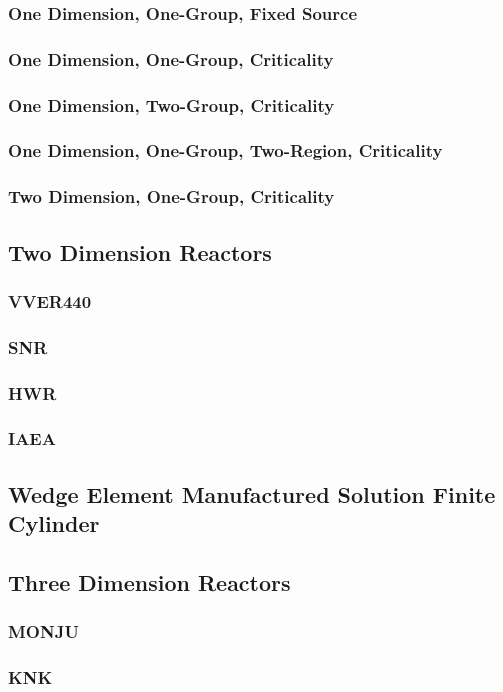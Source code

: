     \subsubsection{One Dimension, One-Group, Fixed Source}
    \subsubsection{One Dimension, One-Group, Criticality}
    \subsubsection{One Dimension, Two-Group, Criticality}
    \subsubsection{One Dimension, One-Group, Two-Region, Criticality}
    \subsubsection{Two Dimension, One-Group, Criticality}
  \subsection{Two Dimension Reactors}
    \subsubsection{VVER440}
    \subsubsection{SNR}
    \subsubsection{HWR}
    \subsubsection{IAEA}
  \subsection{Wedge Element Manufactured Solution Finite Cylinder}
  \subsection{Three Dimension Reactors}
    \subsubsection{MONJU}
    \subsubsection{KNK}
